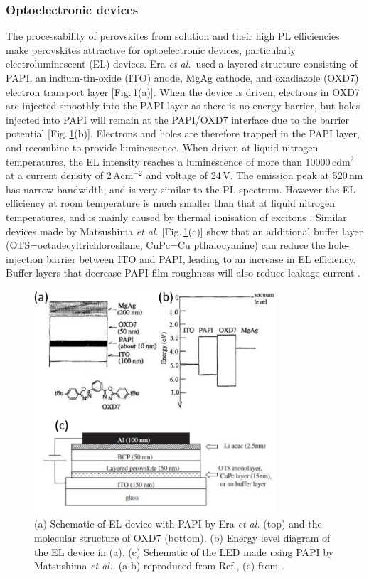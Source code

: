 \subsubsection{Optoelectronic devices}
The processability of perovskites from solution and their high PL efficiencies make perovskites attractive for optoelectronic devices, particularly electroluminescent (EL) devices. Era \textit{et al.}\ used a layered structure consisting of PAPI, an indium-tin-oxide (ITO) anode, MgAg cathode, and oxadiazole (OXD7) electron transport layer [Fig.\,\ref{2Fig22}(a)]. When the device is driven, electrons in OXD7 are injected smoothly into the PAPI layer as there is no energy barrier, but holes injected into PAPI will remain at the PAPI/OXD7 interface due to the barrier potential [Fig.\,\ref{2Fig22}(b)]. Electrons and holes are therefore trapped in the PAPI layer, and recombine to provide luminescence. When driven at liquid nitrogen temperatures, the EL intensity reaches a luminescence of more than 10000\,cd$\textrm{m}^2$ at a current density of 2\,A$\textrm{cm}^{-2}$ and voltage of 24\,V. The emission peak at 520\,nm has narrow bandwidth, and is very similar to the PL spectrum. However the EL efficiency at room temperature is much smaller than that at liquid nitrogen temperatures, and is mainly caused by thermal ionisation of excitons \cite{Era1994}. Similar devices made by Matsushima \textit{et al.} [Fig.\,\ref{2Fig22}(c)] show that an additional buffer layer (OTS=octadecyltrichlorosilane, CuPc=Cu pthalocyanine) can reduce the hole-injection barrier between ITO and PAPI, leading to an increase in EL efficiency. Buffer layers that decrease PAPI film roughness will also reduce leakage current \cite{Matsushima2005}.
\begin{figure}[h!]
\centering
\includegraphics[width=0.8\textwidth]{Fig22}
\caption{(a) Schematic of EL device with PAPI by Era \textit{et al.} (top) and the molecular structure of OXD7 (bottom). (b) Energy level diagram of the EL device in (a). (c) Schematic of the LED made using PAPI by Matsushima \textit{et al.}. (a-b) reproduced from Ref.\cite{Era1994}, (c) from \cite{Matsushima2005}.}
\label{2Fig22}
\end{figure}


